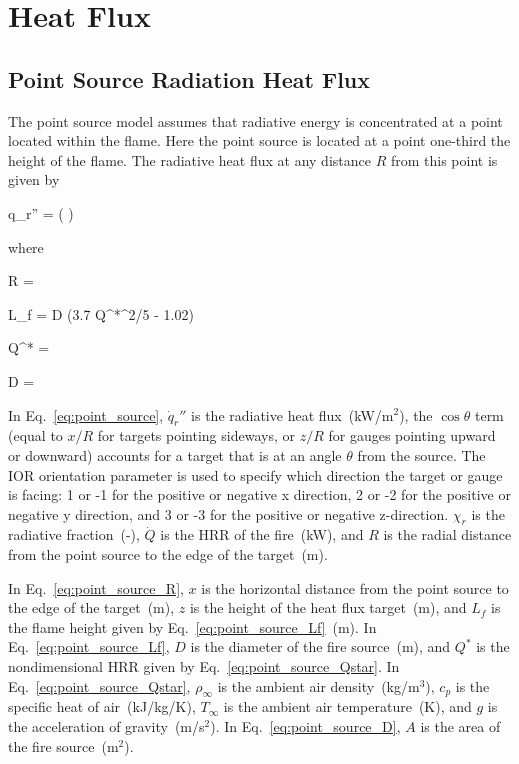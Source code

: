 
\chapter{Heat Flux}
\label{Heat_Flux_Chapter}

\section{Point Source Radiation Heat Flux}

The point source model assumes that radiative energy is concentrated at a point located within the flame. Here the point source is located at a point one-third the height of the flame. The radiative heat flux at any distance $R$ from this point is given by

\be
\dot q_r'' = \cos\theta \left(  \right)
\label{eq:point_source}
\ee

\noindent where

\be
R = 
\label{eq:point_source_R}
\ee

\be
L_f = D (3.7 Q^{*^{2/5}} - 1.02)
\label{eq:point_source_Lf}
\ee

\be
Q^* = 
\label{eq:point_source_Qstar}
\ee

\be
D = 
\label{eq:point_source_D}
\ee

In Eq.~\ref{eq:point_source}, $\dot q_r''$ is the radiative heat flux~(kW/m$^2$), the $\cos\theta$ term (equal to $x/R$ for targets pointing sideways, or $z/R$ for gauges pointing upward or downward) accounts for a target that is at an angle $\theta$ from the source. The IOR orientation parameter is used to specify which direction the target or gauge is facing: 1 or -1 for the positive or negative x direction, 2 or -2 for the positive or negative y direction, and 3 or -3 for the positive or negative z-direction. $\chi_r$ is the radiative fraction~(-), $\dot Q$ is the HRR of the fire~(kW), and $R$ is the radial distance from the point source to the edge of the target~(m).

In Eq.~\ref{eq:point_source_R}, $x$ is the horizontal distance from the point source to the edge of the target~(m), $z$ is the height of the heat flux target~(m), and $L_f$ is the flame height given by Eq.~\ref{eq:point_source_Lf}~(m).
In Eq.~\ref{eq:point_source_Lf}, $D$ is the diameter of the fire source~(m), and $Q^*$ is the nondimensional HRR given by Eq.~\ref{eq:point_source_Qstar}. In Eq.~\ref{eq:point_source_Qstar}, $\rho_\infty$ is the ambient air density~(kg/m$^3$), $c_p$ is the specific heat of air~(kJ/kg/K), $T_\infty$ is the ambient air temperature~(K), and $g$ is the acceleration of gravity~(m/s$^2$). In Eq.~\ref{eq:point_source_D}, $A$ is the area of the fire source~(m$^2$).


